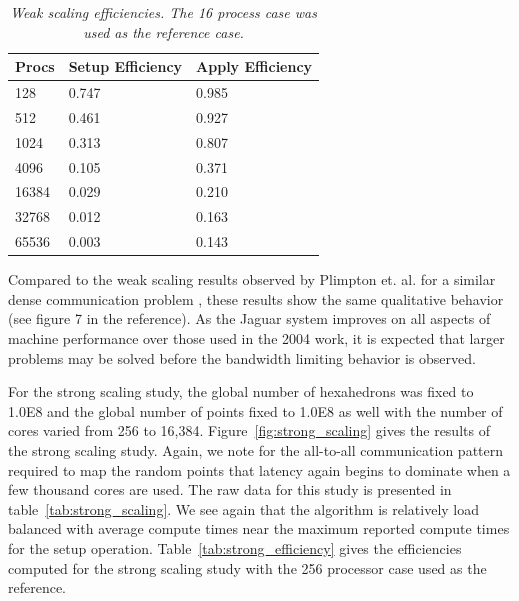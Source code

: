 \documentclass{mc2013}
\begin{document}
\begin{table}[htpb!]
  \begin{center}
    \begin{tabular}{lll}\hline\hline
      \multicolumn{1}{c}{Procs}& 
      \multicolumn{1}{c}{Setup Efficiency} & 
      \multicolumn{1}{c}{Apply Efficiency}\\\hline\hline
      128 &	0.747 &	0.985 \\
      512 &	0.461 &	0.927 \\
      1024 &	0.313 &	0.807 \\
      4096 &	0.105 &	0.371 \\
      16384 &	0.029 &	0.210 \\
      32768 &	0.012 &	0.163 \\
      65536 &	0.003 &	0.143 \\
      \hline\hline
    \end{tabular}
  \end{center}
  \caption{\sl Weak scaling efficiencies. The 16 process case was used
    as the reference case.}
  \label{tab:weak_efficiency}
\end{table}

Compared to the weak scaling results observed by Plimpton et. al. for
a similar dense communication problem \cite{Plimpton_2004}, these
results show the same qualitative behavior (see figure 7 in the
reference). As the Jaguar system improves on all aspects of machine
performance over those used in the 2004 work, it is expected that
larger problems may be solved before the bandwidth limiting behavior
is observed.

\label{subsec:strong_scaling}
For the strong scaling study, the global number of hexahedrons was
fixed to 1.0E8 and the global number of points fixed to 1.0E8 as
well with the number of cores varied from 256 to
16,384. Figure~\ref{fig:strong_scaling} gives the results of the
strong scaling study. Again, we note for the all-to-all communication
pattern required to map the random points that latency again begins to
dominate when a few thousand cores are used. The raw data for this
study is presented in table~\ref{tab:strong_scaling}. We see again
that the algorithm is relatively load balanced with average compute
times near the maximum reported compute times for the setup
operation. Table~\ref{tab:strong_efficiency} gives the efficiencies
computed for the strong scaling study with the 256 processor case used
as the reference.
\end{document}
